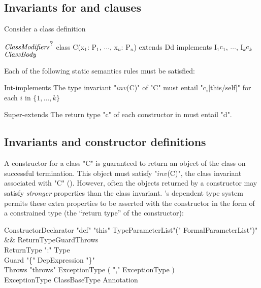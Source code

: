 \subsection{Invariants for  and  clauses}\label{DepType:Implements}
\label{DepType:Extends}
Consider a class definition
\begin{xtenmath}
$\mbox{\emph{ClassModifiers}}^{\mbox{?}}$
class C(x$_1$: P$_1$, $\dots$, x$_n$: P$_n$) extends D{d}
   implements I$_1${c$_1$}, $\dots$, I$_k${c$_k$}
$\mbox{\emph{ClassBody}}$
\end{xtenmath}

Each of the following static semantics rules must be satisfied:

\begin{staticrule}{Int-implements}
The type invariant \xcdmath"$\mathit{inv}$(C)" of \xcd"C" must entail
\xcdmath"c$_i$[this/self]" for each $i$ in $\{1, \dots, k\}$
\end{staticrule}

\begin{staticrule}{Super-extends}
The return type \xcd"c" of each constructor in 
must entail \xcd"d".
\end{staticrule}

\subsection{Invariants and constructor definitions}

A constructor for a class \xcd"C" is guaranteed to return an object of the
class on successful termination. This object must satisfy  \xcdmath"$\mathit{inv}$(C)", the
class invariant associated with \xcd"C" ().
However,
often the objects returned by a constructor may satisfy {\em stronger}
properties than the class invariant. \Xten{}'s dependent type system
permits these extra properties to be asserted with the constructor in
the form of a constrained type (the ``return type'' of the constructor):

\begin{grammar}
ConstructorDeclarator \:
  \xcd"def" \xcd"this" TypeParameterList\opt \xcd"(" FormalParameterList\opt \xcd")" \\
  && ReturnType\opt Guard\opt Throws\opt \\
ReturnType    \: \xcd":" Type \\
Guard   \: "\{" DepExpression "\}" \\
Throws    \: \xcd"throws" ExceptionType  ( \xcd"," ExceptionType )\star \\
ExceptionType \: ClassBaseType Annotation\star \\
\end{grammar}

